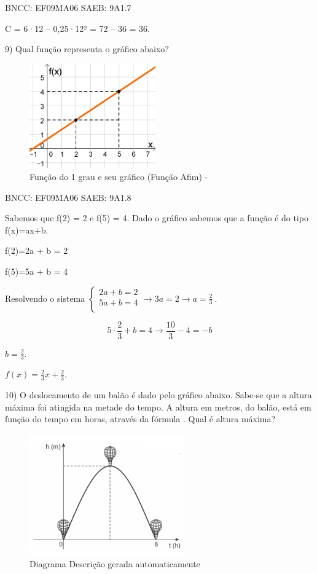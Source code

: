 \begin{escolha}
{{{\begin{escolha}
{BNCC: EF09MA06 SAEB: 9A1.7

C = 6·12 -- 0,25·12² = 72 -- 36 = 36.

9) Qual função representa o gráfico abaixo?

\begin{figure}
\centering
\includegraphics[width=2.14105in,height=1.76667in]{./_SAEB_9_MAT/media/image150.jpeg}
\caption{Função do 1 grau e seu gráfico (Função Afim) -}
\end{figure}

BNCC: EF09MA06 SAEB: 9A1.8

Sabemos que f(2) = 2 e f(5) = 4. Dado o gráfico sabemos que a função é
do tipo f(x)=ax+b.

f(2)=2a + b = 2

f(5)=5a + b = 4

Resolvendo o sistema
\(\left\{ \begin{matrix} 2a + b = 2 \\ 5a + b = 4 \\ \end{matrix} \rightarrow 3a = 2 \rightarrow a = \frac{2}{3} \right.\ \).

\[5 \cdot \frac{2}{3} + b = 4 \rightarrow \frac{10}{3} - 4 = - b\]

\(b = \frac{2}{3}\).

\(f\left( x \right) = \frac{2}{3}x + \frac{2}{3}\).

10) O deslocamento de um balão é dado pelo gráfico abaixo. Sabe-se que a
altura máxima foi atingida na metade do tempo. A altura em metros, do
balão, está em função do tempo em horas, através da fórmula . Qual é
altura máxima?

\begin{figure}
\centering
\includegraphics[width=2.62523in,height=2.05851in]{./_SAEB_9_MAT/media/image154.png}
\caption{Diagrama Descrição gerada automaticamente}
\end{figure}

}
\end{escolha}}}}
\end{escolha}
